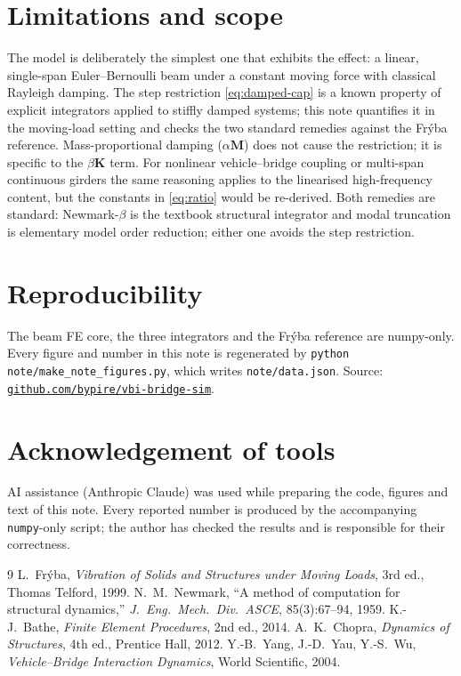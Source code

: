 \documentclass[11pt,a4paper]{article}
\begin{document}
\section{Limitations and scope}
The model is deliberately the simplest one that exhibits the effect: a linear,
single-span Euler--Bernoulli beam under a constant moving force with classical
Rayleigh damping. The step restriction \eqref{eq:damped-cap} is a known property
of explicit integrators applied to stiffly damped systems; this note quantifies
it in the moving-load setting and checks the two standard remedies against the
Fr\'yba reference. Mass-proportional
damping (\(\alpha\mathbf M\)) does not cause the restriction; it is specific to
the \(\beta\mathbf K\) term. For nonlinear vehicle--bridge coupling or
multi-span continuous girders the same reasoning applies to the linearised
high-frequency content, but the constants in \eqref{eq:ratio} would be
re-derived. Both remedies are standard: Newmark-\(\beta\) is the textbook
structural integrator and modal truncation is elementary model order reduction;
either one avoids the step restriction.

\section*{Reproducibility}
The beam FE core, the three integrators and the Fr\'yba reference are numpy-only.
Every figure and number in this note is regenerated by
\texttt{python note/make\_note\_figures.py}, which writes
\texttt{note/data.json}. Source:
\href{https://github.com/bypire/vbi-bridge-sim}{\texttt{github.com/bypire/vbi-bridge-sim}}.

\section*{Acknowledgement of tools}
AI assistance (Anthropic Claude) was used while preparing the code, figures and
text of this note. Every reported number is produced by the accompanying
\texttt{numpy}-only script; the author has checked the results and is
responsible for their correctness.

\begin{thebibliography}{9}
\setlength{\itemsep}{1pt}
 L.~Fr\'yba, \emph{Vibration of Solids and Structures under Moving
  Loads}, 3rd ed., Thomas Telford, 1999.
 N.~M.~Newmark, ``A method of computation for structural
  dynamics,'' \emph{J.\ Eng.\ Mech.\ Div.\ ASCE}, 85(3):67--94, 1959.
 K.-J.~Bathe, \emph{Finite Element Procedures}, 2nd ed., 2014.
 A.~K.~Chopra, \emph{Dynamics of Structures}, 4th ed.,
  Prentice Hall, 2012.
 Y.-B.~Yang, J.-D.~Yau, Y.-S.~Wu, \emph{Vehicle--Bridge Interaction
  Dynamics}, World Scientific, 2004.
\end{thebibliography}
\end{document}
